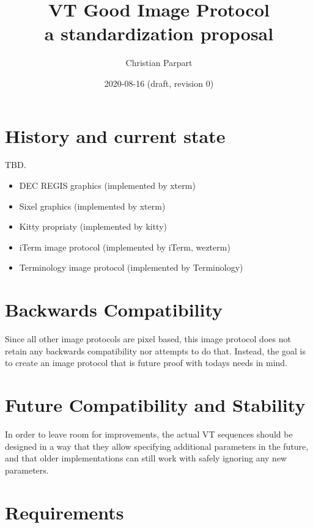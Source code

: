 \documentclass{article}
\title{VT Good Image Protocol \\
a standardization proposal}
\author{Christian Parpart}
\date{2020-08-16 (draft, revision 0)}
\begin{document}
\maketitle

\tableofcontents

\section{History and current state}

TBD.

\begin{itemize}
    \item DEC REGIS graphics (implemented by xterm)
    \item Sixel graphics (implemented by xterm)
    \item Kitty propriaty (implemented by kitty)
    \item iTerm image protocol (implemented by iTerm, wezterm)
    \item Terminology image protocol (implemented by Terminology)
\end{itemize}

\section{Backwards Compatibility}

Since all other image protocols are pixel based, this image protocol does not retain any
backwards compatibility nor attempts to do that. Instead, the goal is to create
an image protocol that is future proof with todays needs in mind.

\section{Future Compatibility and Stability}

In order to leave room for improvements, the actual VT sequences should be designed in a way
that they allow specifying additional parameters in the future, and that older implementations
can still work with safely ignoring any new parameters.

\section{Requirements}
\end{document}
